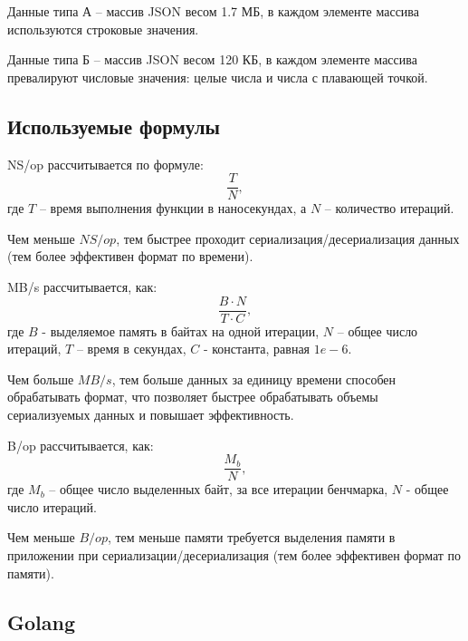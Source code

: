 Данные типа А -- массив JSON весом 1.7 МБ, в каждом элементе массива используются строковые значения.  

Данные типа Б -- массив JSON весом 120 КБ, в каждом элементе массива превалируют числовые значения: целые числа и числа с плавающей точкой.  
\clearpage


\subsection{Используемые формулы}
NS/op рассчитывается по формуле:
\begin{equation}
\frac{T}{N},
\end{equation}
где $T$ -- время выполнения функции в наносекундах, а $N$ -- количество итераций.

Чем меньше $NS/op$, тем быстрее проходит сериализация/десериализация данных (тем более эффективен формат по времени).  

MB/s рассчитывается, как:
\begin{equation}
\frac{B \cdot N}{T \cdot C},
\end{equation}
где $B$ - выделяемое память в байтах на одной итерации, $N$ -- общее число итераций, $T$ -- время в секундах, $C$ - константа, равная $1e-6$.

Чем больше $MB/s$, тем больше данных за единицу времени способен обрабатывать формат, что позволяет быстрее обрабатывать объемы сериализуемых данных и повышает эффективность.  


B/op рассчитывается, как:
\begin{equation}
\dfrac{M_{b}}{N},
\end{equation}
где $M_{b}$ -- общее число выделенных байт, за все итерации бенчмарка, $N$ - общее число итераций.  

Чем меньше $B/op$, тем меньше памяти требуется выделения памяти в приложении при сериализации/десериализация (тем более эффективен формат по памяти).  

\clearpage
\subsection{Golang}

